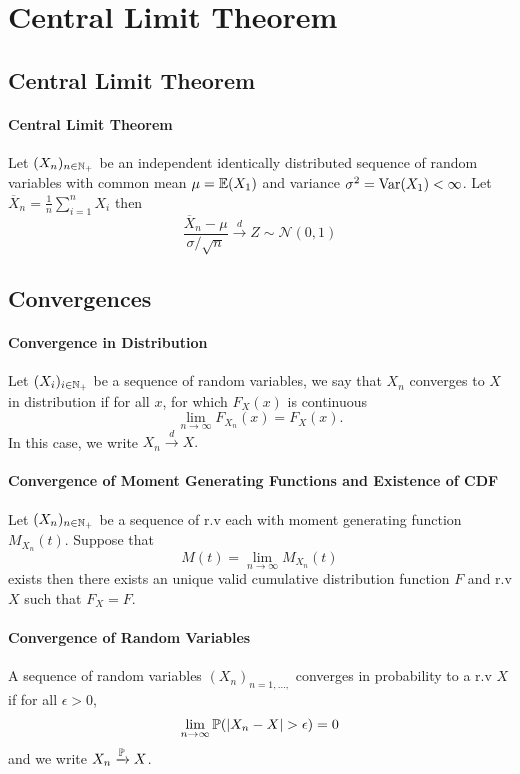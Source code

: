 \section{Central Limit Theorem}

\subsection{Central Limit Theorem}
\paragraph{Central Limit Theorem}
Let \((X_n)_{n\in \mathbb{N}_+}\) be an independent identically distributed sequence of random variables with common mean \(\mu = \mathbb{E}(X_1)\) and variance \(\sigma^2 = \mathrm{Var}(X_1) < \infty\). Let \(\overline{X}_n = \frac{1}{n} \sum_{i=1}^n X_i\) then
\[\frac{\overline{X}_n - \mu}{\sigma / \sqrt{n}} \xrightarrow{d} Z \sim \mathcal{N}(0,1)\]

\subsection{Convergences}
\paragraph{Convergence in Distribution}
Let \((X_i)_{i \in \mathbb{N}_+}\) be a sequence of random variables, we say that \(X_n\) converges to \(X\) in distribution if for all \(x\), for which \(F_X(x)\) is continuous
\[\lim_{n\to\infty} F_{X_n}(x) = F_X(x).\]
In this case, we write \(X_n \xrightarrow{d} X.\)

\paragraph{Convergence of Moment Generating Functions and Existence of CDF}
Let \((X_n)_{n\in \mathbb{N}_+}\) be a sequence of r.v each with moment generating function \(M_{X_n}(t)\). Suppose that 
\[M(t) = \lim_{n \to \infty} M_{X_n}(t)\]
exists then there exists an unique valid cumulative distribution function \(F\) and r.v \(X\) such that \(F_X = F\).

\paragraph{Convergence of Random Variables}
A sequence of random variables \((X_n)_{n=1,\dots,}\) converges in probability to a r.v \(X\) if for all \(\epsilon > 0\),
\[\lim_{n \to \infty} \mathbb{P}(|X_n - X| > \epsilon) = 0\]
and we write \(X_n \xrightarrow{\mathbb{P}} X\).

